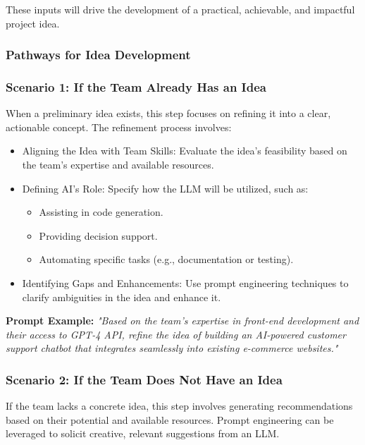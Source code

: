 \documentclass[14pt, a4paper]{article}
\begin{document}
These inputs will drive the development of a practical, achievable, and
impactful project idea.

\subsubsection{Pathways for Idea Development}

\subsubsection*{Scenario 1: If the Team Already Has an Idea}

When a preliminary idea exists, this step focuses on refining it into a clear,
actionable concept. The refinement process involves:

\begin{itemize}
    \item Aligning the Idea with Team Skills: Evaluate the idea’s feasibility
    based on the team's expertise and available resources.
    \item Defining AI's Role: Specify how the LLM will be utilized, such as:
    \begin{itemize}
        \item Assisting in code generation.
        \item Providing decision support.
        \item Automating specific tasks (e.g., documentation or testing).
    \end{itemize}
    \item Identifying Gaps and Enhancements: Use prompt engineering techniques
    to clarify ambiguities in the idea and enhance it.
\end{itemize}

\textbf{Prompt Example:} \textit{"Based on the team's expertise in front-end
development and their access to GPT-4 API, refine the idea of building an
AI-powered customer support chatbot that integrates seamlessly into existing
e-commerce websites."}

\subsubsection*{Scenario 2: If the Team Does Not Have an Idea}

If the team lacks a concrete idea, this step involves generating recommendations
based on their potential and available resources. Prompt engineering can be
leveraged to solicit creative, relevant suggestions from an LLM.
\end{document}
